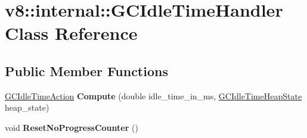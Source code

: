 \hypertarget{classv8_1_1internal_1_1_g_c_idle_time_handler}{}\section{v8\+:\+:internal\+:\+:G\+C\+Idle\+Time\+Handler Class Reference}
\label{classv8_1_1internal_1_1_g_c_idle_time_handler}
\subsection*{Public Member Functions}
\begin{DoxyCompactItemize}
\item 
\hyperlink{classv8_1_1internal_1_1_g_c_idle_time_action}{G\+C\+Idle\+Time\+Action} {\bfseries Compute} (double idle\+\_\+time\+\_\+in\+\_\+ms, \hyperlink{classv8_1_1internal_1_1_g_c_idle_time_heap_state}{G\+C\+Idle\+Time\+Heap\+State} heap\+\_\+state)\hypertarget{classv8_1_1internal_1_1_g_c_idle_time_handler_a598bc79c7b3083e2e123827ed3feef57}{}\label{classv8_1_1internal_1_1_g_c_idle_time_handler_a598bc79c7b3083e2e123827ed3feef57}

\item 
void {\bfseries Reset\+No\+Progress\+Counter} ()\hypertarget{classv8_1_1internal_1_1_g_c_idle_time_handler_a0ced27dfff862c837bf24895c71cc545}{}\label{classv8_1_1internal_1_1_g_c_idle_time_handler_a0ced27dfff862c837bf24895c71cc545}

\end{DoxyCompactItemize}
